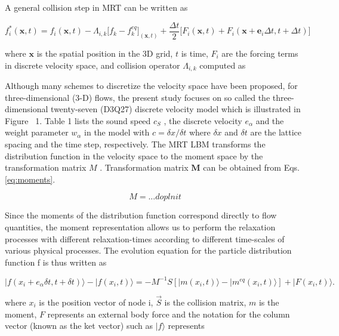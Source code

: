 A general collision step in MRT can be written as \cite{feiModelingRealisticMultiphase2019}

\begin{equation}
	\label{eq:mrt-collision}
	f_i^{*} (\bm{x},t) = f_i (\bm{x},t)-\Lambda_{i,k}\big[f_k - f_k^{eq}\big]_{(\bm{x},t)} +\frac{\Delta t}{2} \big[ F_i (\bm{x},t) +  F_i (\bm{x}+\bm{e}_i\Delta t,t+\Delta t) \big]
\end{equation}

where $\bm{x}$ is the spatial position in the 3D grid, $t$ is time, $F_i$ are the forcing terms in discrete velocity space, and collision operator $\Lambda_{i,k}$ computed as \cite{feiModelingRealisticMultiphase2019}

Although many schemes to discretize the velocity space have been proposed, for three-dimensional (3-D) flows, the present study focuses on so called the three- dimensional twenty-seven (D3Q27) discrete velocity model which is illustrated in Figure~ 1. Table 1 lists the sound speed $c_S$ , the discrete velocity $e_\alpha$ and the weight parameter $w_\alpha$ in the model with $c = \delta x / \delta t$ where $\delta x$ and $\delta t$ are the lattice spacing and the time step, respectively. The MRT LBM transforms the distribution function in the velocity space to the moment space by the transformation matrix $M$ . Transformation matrix $\bm{M}$ can be obtained from Eqs. \ref{eq:moments}.

\begin{equation}
	\label{eq:moments}
	M = ... doplnit
\end{equation}

Since the moments of the distribution function correspond directly to flow quantities, the moment representation allows us to perform the relaxation processes with different relaxation-times according to different time-scales of various physical processes. The evolution equation for the particle distribution function f is thus written as

\begin{equation}
	|f (x_i +e_\alpha \delta t,t+ \delta t)\rangle-|f (x_i,t)\rangle=-M^{-1} S [|m(x_i,t)\rangle - |m^{eq} (x_i,t)\rangle]+|F(x_i,t)\rangle.
\end{equation}

where $x_i$ is the position vector of node i, $\vec{S}$ is the collision matrix, $m$ is the moment, $F$ represents an external body force and the notation for the column vector (known as the ket vector) such as $|f \rangle$ represents


